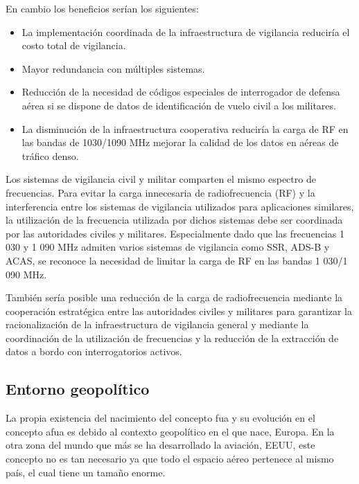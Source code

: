 \begin{enumerate}
\begin{enumerate}
        En cambio los beneficios serían los siguientes:
        
        \begin{itemize}
            \item La implementación coordinada de la infraestructura de vigilancia reduciría el costo total de vigilancia.
            \item Mayor redundancia con múltiples sistemas.
            \item Reducción de la necesidad de códigos especiales de interrogador de defensa aérea si se dispone de datos de identificación de vuelo civil a los militares.
            \item La disminución de la infraestructura cooperativa reduciría la carga de RF en las bandas de 1030/1090 MHz mejorar la calidad de los datos en aéreas de tráfico denso.
        \end{itemize}
        
        Los sistemas de vigilancia civil y militar comparten el mismo espectro de frecuencias. Para evitar la carga innecesaria de radiofrecuencia (RF) y la interferencia entre los sistemas de vigilancia utilizados para aplicaciones similares, la utilización de la frecuencia utilizada por dichos sistemas debe ser coordinada por las autoridades civiles y militares. Especialmente dado que las frecuencias 1 030 y 1 090 MHz admiten varios sistemas de vigilancia como SSR, ADS-B y ACAS, se reconoce la necesidad de limitar la carga de RF en las bandas 1 030/1 090 MHz. 
        
        También sería posible una reducción de la carga de radiofrecuencia mediante la cooperación estratégica entre las autoridades civiles y militares para garantizar la racionalización de la infraestructura de vigilancia general y mediante la coordinación de la utilización de frecuencias y la reducción de la extracción de datos a bordo con interrogatorios activos.
    \end{enumerate}
\end{enumerate}


\subsection{Entorno geopolítico}

La propia existencia del nacimiento del concepto \acrfull{fua} y su evolución en el concepto \acrfull{afua} es debido al contexto geopolítico en el que nace, Europa. En la otra zona del mundo que más se ha desarrollado la aviación, EEUU, este concepto no es tan necesario ya que todo el espacio aéreo pertenece al mismo país, el cual tiene un tamaño enorme. 

